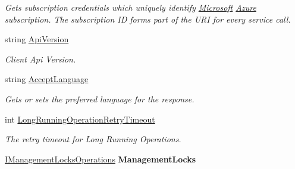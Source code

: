 \begin{DoxyCompactItemize}
\begin{DoxyCompactList}\small\item\em Gets subscription credentials which uniquely identify \hyperlink{namespace_microsoft}{Microsoft} \hyperlink{namespace_microsoft_1_1_azure}{Azure} subscription. The subscription ID forms part of the U\+RI for every service call. \end{DoxyCompactList}\item 
string \hyperlink{interface_microsoft_1_1_azure_1_1_management_1_1_resources_1_1_i_authorization_client_af88a64d6177da1f76fe2db44e7d5d20d}{Api\+Version}
\begin{DoxyCompactList}\small\item\em Client Api Version. \end{DoxyCompactList}\item 
string \hyperlink{interface_microsoft_1_1_azure_1_1_management_1_1_resources_1_1_i_authorization_client_a9886b312e9966ef74e7bf459cb2a4d7d}{Accept\+Language}
\begin{DoxyCompactList}\small\item\em Gets or sets the preferred language for the response. \end{DoxyCompactList}\item 
int \hyperlink{interface_microsoft_1_1_azure_1_1_management_1_1_resources_1_1_i_authorization_client_a88a4000cd5c8e2077baabcb8ae8dfce9}{Long\+Running\+Operation\+Retry\+Timeout}
\begin{DoxyCompactList}\small\item\em The retry timeout for Long Running Operations. \end{DoxyCompactList}\item 
\hyperlink{interface_microsoft_1_1_azure_1_1_management_1_1_resources_1_1_i_management_locks_operations}{I\+Management\+Locks\+Operations} {\bfseries Management\+Locks}\hypertarget{interface_microsoft_1_1_azure_1_1_management_1_1_resources_1_1_i_authorization_client_ae3ee61ba759b13780fede3583e34bfc2}{}\label{interface_microsoft_1_1_azure_1_1_management_1_1_resources_1_1_i_authorization_client_ae3ee61ba759b13780fede3583e34bfc2}

\end{DoxyCompactItemize}


